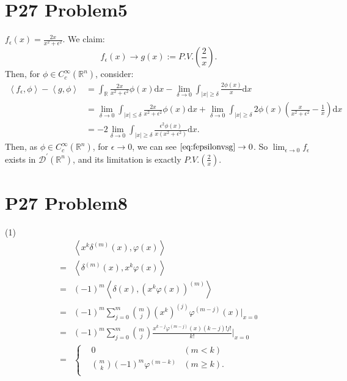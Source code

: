 \documentclass[a4paper]{ctexart}
\newcommand{\dif}{\mathrm{d}}
\newcommand{\innerprod}[2]{\left<#1,#2\right>}
\begin{document}
\section*{P27 Problem5}
$f_{\epsilon}(x)=\frac{2x}{x^{2}+\epsilon^{2}}$. We claim:
\begin{equation}
    f_{\epsilon}(x)\rightarrow g(x):=P.V.(\frac{2}{x}).
\end{equation}
Then, for $\phi\in C_{c}^{\infty}(\mathbb{R}^{n})$, consider:
\begin{equation}
    \begin{aligned}
        \label{eq:fepsilonvsg}
        \left<f_{\epsilon},\phi\right>-\left<g,\phi\right>&=\int_{\mathbb{R}}\frac{2x}{x^{2}+\epsilon^{2}}\phi(x)\dif x-\lim_{\delta\rightarrow 0}\int_{|x|\ge\delta}\frac{2\phi(x)}{x}\dif x\\
        &=\lim_{\delta\rightarrow 0}\int_{|x|\le\delta}\frac{2x}{x^{2}+\epsilon^{2}}\phi(x)\dif x+\lim_{\delta\rightarrow 0}\int_{|x|\ge\delta}2\phi(x)(\frac{x}{x^{2}+\epsilon^{2}}-\frac{1}{x})\dif x\\
        &=-2\lim_{\delta\rightarrow 0}\int_{|x|\ge\delta}\frac{\epsilon^{2}\phi(x)}{x(x^{2}+\epsilon^{2})}\dif x.
    \end{aligned}
\end{equation}
Then, as $\phi\in C_{c}^{\infty}(\mathbb{R}^{n})$, for $\epsilon\rightarrow 0$, we can see $\eqref{eq:fepsilonvsg}\rightarrow 0$. So $\lim_{\epsilon\rightarrow 0}f_{\epsilon}$ exists in $\mathcal{D}^{'}(\mathbb{R}^{n})$, and its limitation is exactly $P.V.(\frac{2}{x})$.
\section*{P27 Problem8}
(1)
\begin{equation}
    \begin{aligned}
        &\innerprod{x^{k}\delta^{(m)}(x)}{\varphi(x)}\\
        =&\innerprod{\delta^{(m)}(x)}{x^{k}\varphi(x)}\\
        =&(-1)^{m}\innerprod{\delta(x)}{(x^{k}\varphi(x))^(m)}\\
        =&(-1)^{m}\sum_{j=0}^{m}\binom{m}{j}(x^{k})^{(j)}\varphi^{(m-j)}(x)|_{x=0}\\
        =&(-1)^{m}\sum_{j=0}^{m}\binom{m}{j}\frac{x^{k-j}\varphi^{(m-j)}(x)(k-j)!j!}{k!}|_{x=0}\\
        =&\left\{
            \begin{aligned}
                &0&(m<k)\\
                &\binom{m}{k}(-1)^{m}\varphi^{(m-k)}&(m\ge k).\\
            \end{aligned}
        \right.
    \end{aligned}
\end{equation}
\end{document}
